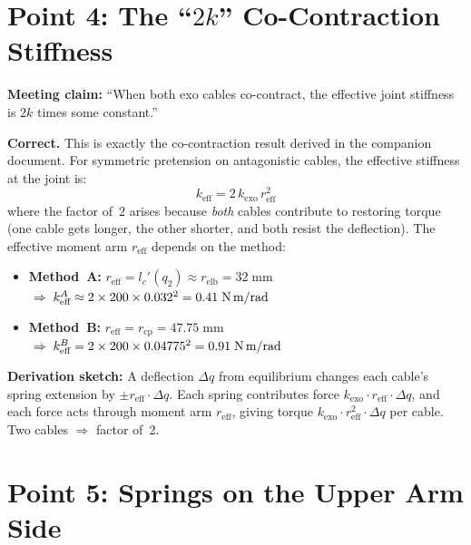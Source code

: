 \documentclass[11pt, a4paper]{article}
\newenvironment{correct}{%
  \begin{mdframed}[backgroundcolor=green!8, linecolor=green!50!black]%
  \textbf{\color{green!50!black}\checkmark\; Correct.}\;}{\end{mdframed}}
\begin{document}
\section{Point 4: The ``$2k$'' Co-Contraction Stiffness}
\label{sec:point4}

\noindent
\textbf{Meeting claim:} ``When both exo cables co-contract, the effective
joint stiffness is $2k$ times some constant.''

\begin{correct}
This is exactly the co-contraction result derived in the companion document.
For symmetric pretension on antagonistic cables, the effective stiffness at
the joint is:
%
\begin{equation}\label{eq:keff-general}
  \boxed{k_{\text{eff}} = 2 \, k_{\text{exo}} \, r_{\text{eff}}^2}
\end{equation}
%
where the factor of~$2$ arises because \emph{both} cables contribute to
restoring torque (one cable gets longer, the other shorter, and both resist
the deflection).  The effective moment arm $r_{\text{eff}}$ depends on the
method:

\begin{itemize}[nosep]
  \item \textbf{Method~A:}
    $r_{\text{eff}} = l_c'(q_2)
    \approx r_{\text{elb}} = 32\;\text{mm}$
    $\;\Rightarrow\;
    k_{\text{eff}}^A \approx 2 \times 200 \times 0.032^2
    = 0.41\;\text{N\,m/rad}$

  \item \textbf{Method~B:}
    $r_{\text{eff}} = r_{\text{cp}} = 47.75\;\text{mm}$
    $\;\Rightarrow\;
    k_{\text{eff}}^B = 2 \times 200 \times 0.04775^2
    = 0.91\;\text{N\,m/rad}$
\end{itemize}

\noindent
\textbf{Derivation sketch:}
A deflection $\Delta q$ from equilibrium changes each cable's spring
extension by $\pm r_{\text{eff}} \cdot \Delta q$.  Each spring contributes
force $k_{\text{exo}} \cdot r_{\text{eff}} \cdot \Delta q$, and each force
acts through moment arm $r_{\text{eff}}$, giving torque
$k_{\text{exo}} \cdot r_{\text{eff}}^2 \cdot \Delta q$ per cable.  Two
cables $\Rightarrow$ factor of~2.
\end{correct}


\section{Point 5: Springs on the Upper Arm Side}
\label{sec:point5}
\end{document}
